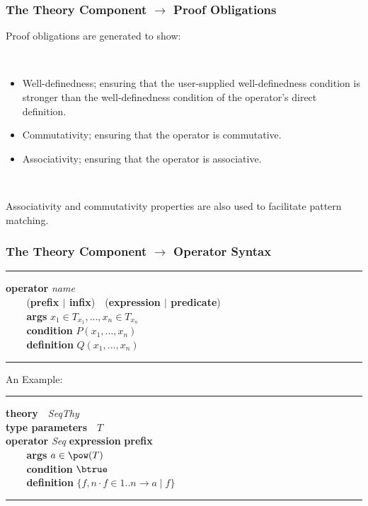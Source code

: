 \documentclass{beamer}
\begin{document}
	\begin{frame}
		\frametitle{The Theory Component $\rightarrow$ Proof Obligations}
		Proof obligations are generated to show:

~

		\begin{itemize}
			\item Well-definedness; ensuring that the user-supplied well-definedness condition is stronger than the well-definedness condition of the operator's direct definition.
			\item Commutativity; ensuring that the operator is commutative.
			\item Associativity; ensuring that the operator is associative.
		\end{itemize}

~

		Associativity and commutativity properties are also used to facilitate pattern matching.
	\end{frame}






	\begin{frame}
		\frametitle{The Theory Component $\rightarrow$ Operator Syntax}
		\hrule
		\vspace{3pt}
		\textbf{operator} \textit{name} \\
		$~~~~~~~~$ (\textbf{prefix $\mid$ infix})~~(\textbf{expression $\mid$ predicate})\\
		$~~~~~~~~$ \textbf{args} $x_1\in T_{x_1},..., x_n\in T_{x_n}$\\
		$~~~~~~~~$ \textbf{condition} $P(x_1,...,x_n)$\\
		$~~~~~~~~$ \textbf{definition} $Q(x_1,...,x_n)$\\
		\vspace{3pt}
		\hrule
		\vspace{12pt}
		An Example:
		\vspace{3pt}
		\hrule
		\vspace{3pt}
		\textbf{theory}~~\textit{SeqThy}\\
		\textbf{type parameters}~~$T$\\
		\textbf{operator} \textit{Seq} \textbf{expression} \textbf{prefix}\\
		$~~~~~~~~$ \textbf{args} $a\in \pow(T)$\\
		$~~~~~~~~$ \textbf{condition} $\btrue$\\
		$~~~~~~~~$ \textbf{definition} $\{f,n \cdot f\in 1..n \rightarrow a \mid f\}$
		\vspace{3pt}
		\hrule
	\end{frame}
\end{document}
